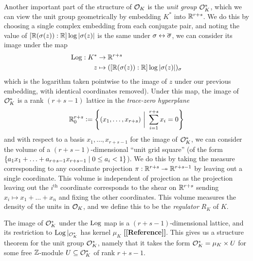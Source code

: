 \documentclass[11pt]{report}
\begin{document}
Another important part of the structure of $\mathcal{O}_K$ is the \emph{unit group} $\mathcal{O}_K^*$, which we can view the unit group geometrically by embedding $K^*$ into $\mathbb{R}^{r + s}$. We do this by choosing a single complex embedding from each conjugate pair, and noting the value of $[\mathbb{R}(\sigma(z)) : \mathbb{R}]\log\left| \sigma(z) \right|$ is the same under $\sigma \leftrightarrow \overline{\sigma}$, we can consider its image under the map
\begin{align*}
    \operatorname{Log} : K^* &\to \mathbb{R}^{r + s} \\
    z &\mapsto ([\mathbb{R}(\sigma(z)) : \mathbb{R}]\log\left| \sigma(z) \right|)_{\sigma}
\end{align*}
which is the logarithm taken pointwise to the image of $z$ under our previous embedding, with identical coordinates removed). Under this map, the image of $\mathcal{O}_K^*$ is a rank $(r + s - 1)$ lattice in the \emph{trace-zero hyperplane}
$$
    \mathbb{R}_0^{r + s} \vcentcolon= \left\{  (x_1, \ldots, x_{r + s}) \ \bigg| \ \sum_{i = 1}^{r + s}x_i = 0  \right\}
$$
and with respect to a basis $x_1, \ldots, x_{r + s - 1}$ for the image of $\mathcal{O}_K^*$, we can consider the volume of a $(r + s - 1)$-dimensional ``unit grid square'' (of the form $\left\{  a_1x_1 + \ldots + a_{r + s - 1}x_{r + s - 1} \mid 0 \leq a_i < 1  \right\}$). We do this by taking the measure corresponding to any coordinate projection $\pi : \mathbb{R}^{r + s} \twoheadrightarrow \mathbb{R}^{r + s - 1}$ by leaving out a single coordinate. This volume is independent of projection as the projection leaving out the $i^{\text{th}}$ coordinate corresponds to the shear on $\mathbb{R}^{r + s}$ sending $x_i \mapsto x_1 + \ldots + x_n$ and fixing the other coordinates. This volume measures the density of the units in $\mathcal{O}_K$, and we define this to be the \emph{regulator} $R_K$ of $K$.

The image of $\mathcal{O}_K^*$ under the $\operatorname{Log}$ map is a $(r + s - 1)$-dimensional lattice, and its restriction to $\operatorname{Log}|_{\mathcal{O}_K^*}$ has kernel $\mu_K$ \textbf{[[Reference]]}. This gives us a structure theorem for the unit group $\mathcal{O}_K^*$, namely that it takes the form $\mathcal{O}_K^* = \mu_K \times U$ for some free $\mathbb{Z}$-module $U \subseteq \mathcal{O}_K^*$ of rank $r + s - 1$.
\end{document}
